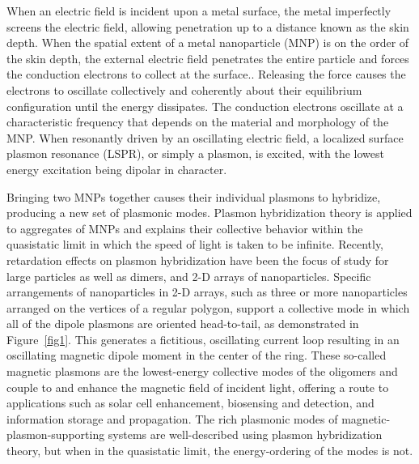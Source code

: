 \documentclass[journal=jpccck,manuscript=article]{achemso}
\begin{document}
When an electric field is incident upon a metal surface, the metal imperfectly screens the electric field, allowing penetration up to a distance known as the skin depth. When the spatial extent of a metal nanoparticle (MNP) is on the order of the skin depth, the external electric field penetrates the entire particle and forces the conduction electrons to collect at the surface.\cite{KREIBIG1985}. Releasing the force causes the electrons to oscillate collectively and coherently about their equilibrium configuration until the energy dissipates. The conduction electrons oscillate at a characteristic frequency that depends on the material and morphology of the MNP. When resonantly driven by an oscillating electric field, a localized surface plasmon resonance (LSPR), or simply a plasmon, is excited, with the lowest energy excitation being dipolar in character.

Bringing two MNPs together causes their individual plasmons to hybridize, producing a new set of plasmonic modes\cite{Lucas1976,ARAVIND1981,Xu1995,Mischenko1995}. Plasmon hybridization theory is applied to aggregates of MNPs and explains their collective behavior within the quasistatic limit in which the speed of light is taken to be infinite\cite{NordHal2003,NordProdan2004,Oubre2004,Gomez2009}. Recently, retardation effects on plasmon hybridization have been the focus of study for large particles\cite{Abajo2008,Gu2010} as well as dimers\cite{vonPlessen2007,Rechbacher2003,Kottman2001}, and 2-D arrays\cite{Schatz2003,Royer2005,Chumanov2010} of nanoparticles. Specific arrangements of nanoparticles in 2-D arrays, such as three or more nanoparticles arranged on the vertices of a regular polygon, support a collective mode in which all of the dipole plasmons are oriented head-to-tail, as demonstrated in Figure~\ref{fig1}. This generates a fictitious, oscillating current loop resulting in an oscillating magnetic dipole moment in the center of the ring\cite{Alu2006,Alu2008,Liu2011,Nord2006,Cherqui2014}. These so-called magnetic plasmons are the lowest-energy collective modes of the oligomers and couple to and enhance the magnetic field of incident light\cite{Shalaev2007,Qian2015,Nord2007}, offering a route to applications such as solar cell enhancement\cite{Graydon2011,Alu2014solar,Le2015solar}, biosensing and detection\cite{Zia2010trans,Noginova2008trans,Wang:13,Fan2015,Wei2015,Shvets2012,Altug2012bio,Nord2011fano}, and information storage and propagation\cite{Zhang2006,NordHal2011,NordHal2012}. The rich plasmonic modes of magnetic-plasmon-supporting systems are well-described using plasmon hybridization theory, but when in the quasistatic limit, the energy-ordering of the modes is not.
\end{document}
